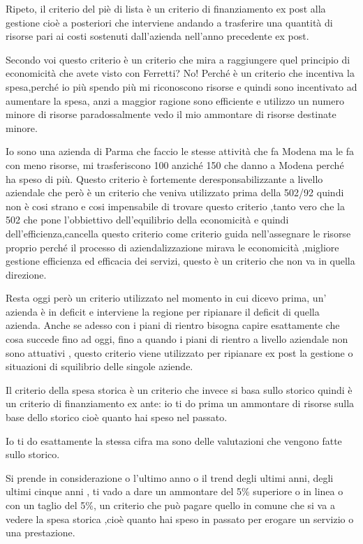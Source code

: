 Ripeto, il criterio del piè di lista è un criterio di finanziamento ex
post alla gestione cioè a posteriori che interviene andando a trasferire
una quantità di risorse pari ai costi sostenuti dall'azienda nell'anno
precedente ex post.

Secondo voi questo criterio è un criterio che mira a raggiungere quel
principio di economicità che avete visto con Ferretti? No! Perché è un
criterio che incentiva la spesa,perché io più spendo più mi riconoscono
risorse e quindi sono incentivato ad aumentare la spesa, anzi a maggior
ragione sono efficiente e utilizzo un numero minore di risorse
paradossalmente vedo il mio ammontare di risorse destinate minore.

Io sono una azienda di Parma che faccio le stesse attività che fa Modena
ma le fa con meno risorse, mi trasferiscono 100 anziché 150 che danno a
Modena perché ha speso di più. Questo criterio è fortemente
deresponsabilizzante a livello aziendale che però è un criterio che
veniva utilizzato prima della 502/92 quindi non è cosi strano e cosi
impensabile di trovare questo criterio ,tanto vero che la 502 che pone
l'obbiettivo dell'equilibrio della economicità e quindi
dell'efficienza,cancella questo criterio come criterio guida
nell'assegnare le risorse proprio perché il processo di
aziendalizzazione mirava le economicità ,migliore gestione efficienza ed
efficacia dei servizi, questo è un criterio che non va in quella
direzione.

Resta oggi però un criterio utilizzato nel momento in cui dicevo prima,
un' azienda è in deficit e interviene la regione per ripianare il
deficit di quella azienda. Anche se adesso con i piani di rientro
bisogna capire esattamente che cosa succede fino ad oggi, fino a quando
i piani di rientro a livello aziendale non sono attuativi , questo
criterio viene utilizzato per ripianare ex post la gestione o situazioni
di squilibrio delle singole aziende.

Il criterio della spesa storica è un criterio che invece si basa sullo
storico quindi è un criterio di finanziamento ex ante: io ti do prima un
ammontare di risorse sulla base dello storico cioè quanto hai speso nel
passato.

Io ti do esattamente la stessa cifra ma sono delle valutazioni che
vengono fatte sullo storico.

Si prende in considerazione o l'ultimo anno o il trend degli ultimi
anni, degli ultimi cinque anni , ti vado a dare un ammontare del 5\%
superiore o in linea o con un taglio del 5\%, un criterio che può pagare
quello in comune che si va a vedere la spesa storica ,cioè quanto hai
speso in passato per erogare un servizio o una prestazione.

